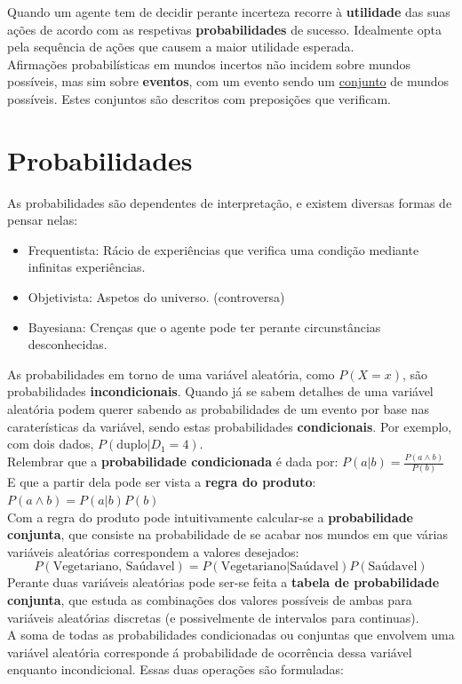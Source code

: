 \documentclass[]{report}
\begin{document}
Quando um agente tem de decidir perante incerteza recorre à \textbf{utilidade} das suas ações de acordo com as respetivas \textbf{probabilidades} de sucesso. Idealmente opta pela sequência de ações que causem a maior utilidade esperada.\\[2mm]
Afirmações probabilísticas em mundos incertos não incidem sobre mundos possíveis, mas sim sobre \textbf{eventos}, com um evento sendo um \underline{conjunto} de mundos possíveis. Estes conjuntos são descritos com preposições que verificam.
\section{Probabilidades}
As probabilidades são dependentes de interpretação, e existem diversas formas de pensar nelas:
\begin{itemize}
\item Frequentista: Rácio de experiências que verifica uma condição mediante infinitas experiências.
\item Objetivista: Aspetos do universo. (controversa)
\item Bayesiana: Crenças que o agente pode ter perante circunstâncias desconhecidas.
\end{itemize}
As probabilidades em torno de uma variável aleatória, como $P(X=x)$, são probabilidades \textbf{incondicionais}.
Quando já se sabem detalhes de uma variável aleatória podem querer sabendo as probabilidades de um evento por base nas caraterísticas da variável, sendo estas probabilidades \textbf{condicionais}. Por exemplo, com dois dados, $P(\text{duplo}|D_1 = 4)$.\\[5mm]
Relembrar que a \textbf{probabilidade condicionada} é dada por: $P(a|b) = \frac{P(a \wedge b)}{P(b)}$\\
E que a partir dela pode ser vista a \textbf{regra do produto}: $P(a \wedge b) = P(a|b)P(b)$\\[2mm]
Com a regra do produto pode intuitivamente calcular-se a \textbf{probabilidade conjunta}, que consiste na probabilidade de se acabar nos mundos em que várias variáveis aleatórias correspondem a valores desejados:
$$P(\text{Vegetariano, Saúdavel}) = P(\text{Vegetariano}|\text{Saúdavel})P(\text{Saúdavel})$$
Perante duas variáveis aleatórias pode ser-se feita a \textbf{tabela de probabilidade conjunta}, que estuda as combinações dos valores possíveis de ambas para variáveis aleatórias discretas (e possivelmente de intervalos para continuas).\\[2mm]
A soma de todas as probabilidades condicionadas ou conjuntas que envolvem uma variável aleatória corresponde á probabilidade de ocorrência dessa variável enquanto incondicional. Essas duas operações são formuladas:
\end{document}
